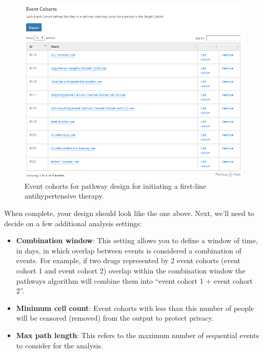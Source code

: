 \documentclass[11pt]{book}
\providecommand{\tightlist}{%
  \setlength{\itemsep}{0pt}\setlength{\parskip}{0pt}}
\theoremstyle{definition}
\theoremstyle{definition}
\theoremstyle{definition}
\theoremstyle{remark}
\begin{document}
\begin{figure}

{\centering \includegraphics[width=1\linewidth]{images/Characterization/atlasPathwaysEventCohorts} 

}

\caption{Event cohorts for pathway design for initiating a first-line antihypertensive therapy.}\label{fig:atlasPathwaysEventCohorts}
\end{figure}

When complete, your design should look like the one above. Next, we'll need to decide on a few additional analysis settings:

\begin{itemize}
\tightlist
\item
  \textbf{Combination window}: This setting allows you to define a window of time, in days, in which overlap between events is considered a combination of events. For example, if two drugs represented by 2 event cohorts (event cohort 1 and event cohort 2) overlap within the combination window the pathways algorithm will combine them into ``event cohort 1 + event cohort 2''.
\item
  \textbf{Minimum cell count}: Event cohorts with less than this number of people will be censored (removed) from the output to protect privacy.
\item
  \textbf{Max path length}: This refers to the maximum number of sequential events to consider for the analysis.
\end{itemize}
\end{document}
